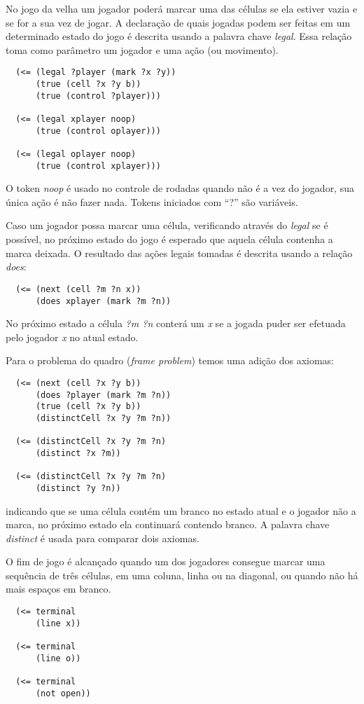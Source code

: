 No jogo da velha um jogador poderá marcar uma das células se ela estiver vazia e
se for a sua vez de jogar. A declaração de quais jogadas podem ser feitas em um
determinado estado do jogo é descrita usando a palavra chave {\it legal}. Essa
relação toma como parâmetro um jogador e uma ação (ou movimento).
\begin{verbatim}
  (<= (legal ?player (mark ?x ?y))
      (true (cell ?x ?y b))
      (true (control ?player)))
 
  (<= (legal xplayer noop)
      (true (control oplayer)))
 
  (<= (legal oplayer noop)
      (true (control xplayer)))
\end{verbatim}
O token {\it noop} é usado no controle de rodadas quando não é a vez do
jogador, sua única ação é não fazer nada. Tokens iniciados com ``?'' são
variáveis.
 
 
Caso um jogador possa marcar uma célula, verificando através do {\it legal} se é
possível, no próximo estado do jogo é esperado que aquela célula contenha a
marca deixada. O resultado das ações legais tomadas é descrita usando a relação
{\it does}:
\begin{verbatim}
  (<= (next (cell ?m ?n x))
      (does xplayer (mark ?m ?n))
\end{verbatim}
No próximo estado a célula {\it ?m ?n} conterá um {\it x} se a jogada puder ser
efetuada pelo jogador {\it x} no atual estado.
 
Para o problema do quadro ({\it frame problem}) temos uma adição dos axiomas:
\begin{verbatim}
  (<= (next (cell ?x ?y b))
      (does ?player (mark ?m ?n))
      (true (cell ?x ?y b))
      (distinctCell ?x ?y ?m ?n))
 
  (<= (distinctCell ?x ?y ?m ?n)
      (distinct ?x ?m))
 
  (<= (distinctCell ?x ?y ?m ?n)
      (distinct ?y ?n))
\end{verbatim}
indicando que se uma célula contém um branco no estado atual e o jogador não a
marca, no próximo estado ela continuará contendo branco. A palavra chave {\it
  distinct} é usada para comparar dois axiomas.
 
O fim de jogo é alcançado quando um dos jogadores consegue marcar uma sequência
de três células, em uma coluna, linha ou na diagonal, ou quando não há mais
espaços em branco.
\begin{verbatim}
  (<= terminal
      (line x))
 
  (<= terminal
      (line o))
 
  (<= terminal
      (not open))
\end{verbatim}
 
